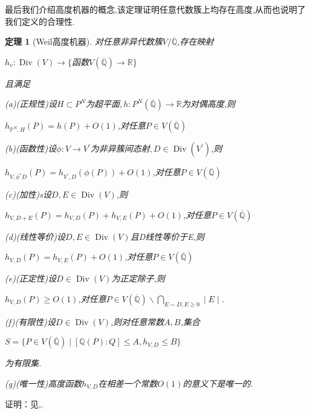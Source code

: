 \documentclass[11pt]{ctexart}
\DeclareMathOperator{\Div}{Div}
\newtheorem{thm}{定理}[section]
\begin{document}
最后我们介绍高度机器的概念,该定理证明任意代数簇上均存在高度,从而也说明了我们定义的合理性.
\begin{thm}[Weil高度机器]对任意非异代数簇$V/\overline{\mathbb{Q}}$,存在映射
    \begin{center}
        $h_v:\Div(V)\rightarrow \{$函数$V(\overline{\mathbb{Q}})\rightarrow \mathbb{R}\}$
    \end{center}
    且满足
    
    \noindent(a)(正规性)设$H\subset P^N$为超平面$,h:P^N(\overline{\mathbb{Q}})\rightarrow \mathbb{R}$为对偶高度,则
    \begin{center}
        $h_{\mathbb{P}^N,H}(P)=h(P)+O(1)$,对任意$P\in V(\overline{\mathbb{Q}})$
    \end{center}
    
    \noindent(b)(函数性)设$\phi:V \rightarrow V^{\prime}$为非异簇间态射$,D\in \Div(V^{\prime})$,则
    \begin{center}
        $h_{V,\phi^{*}D}(P)=h_{V^{\prime},D}(\phi(P))+O(1)$,对任意$P\in V(\overline{\mathbb{Q}})$
    \end{center}
    
    \noindent(c)(加性)s设$D,E\in \Div(V)$,则
    \begin{center}
        $h_{V,D+E}(P)=h_{V,D}(P)+h_{V,E}(P)+O(1)$,对任意$P\in V(\overline{\mathbb{Q}})$
    \end{center}
    
    \noindent(d)(线性等价)设$D,E\in \Div(V)$且D线性等价于E,则
    \begin{center}
        $h_{V,D}(P)=h_{V,E}(P)+O(1)$,对任意$P\in V(\overline{\mathbb{Q}})$
    \end{center}
    
    
    
    \noindent(e)(正定性)设$D\in \Div(V)$为正定除子,则
    \begin{center}
        $h_{V,D}(P)\geq O(1)$,对任意$P\in V(\overline{\mathbb{Q}})\backslash \bigcap\limits_{E\sim D,E\geq 0} \mid E \mid$.
    \end{center}
    
    
    \noindent(f)(有限性)设$D\in \Div(V)$,则对任意常数$A,B$,集合
    \begin{center}
        $S=\{P\in V(\overline{\mathbb{Q}})\mid [\mathbb{Q}(P):Q]\leq A,h_{V,D}\leq B\}$
    \end{center}
    为有限集.
    
    \noindent(g)(唯一性)高度函数$h_{V,D}$在相差一个常数$O(1)$的意义下是唯一的.
    
\end{thm}
\noindent 证明：见\cite{Bombieri2006},\cite{GTM241}.
\end{document}
